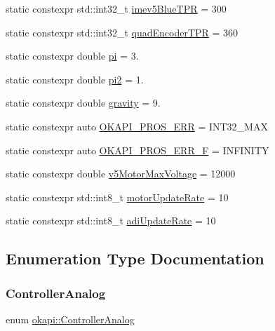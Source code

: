 \begin{DoxyCompactItemize}
\item 
static constexpr std\+::int32\+\_\+t \mbox{\hyperlink{namespaceokapi_a8d9e012d255d1fc2154c0dd9345d61ae}{imev5\+Blue\+T\+PR}} = 300
\item 
static constexpr std\+::int32\+\_\+t \mbox{\hyperlink{namespaceokapi_ad45ebef87cdaccd36ca4234d0bfdeee3}{quad\+Encoder\+T\+PR}} = 360
\item 
static constexpr double \mbox{\hyperlink{namespaceokapi_a3456eff6b02ec38b7771c227250f101c}{pi}} = 3.
\item 
static constexpr double \mbox{\hyperlink{namespaceokapi_a0f3c3909136daa4ae9532361a870a213}{pi2}} = 1.
\item 
static constexpr double \mbox{\hyperlink{namespaceokapi_a35009d9782cfcf5a519ff7d8fc39f86f}{gravity}} = 9.
\item 
static constexpr auto \mbox{\hyperlink{namespaceokapi_a18913fb1230fd1353366981f1f78335c}{O\+K\+A\+P\+I\+\_\+\+P\+R\+O\+S\+\_\+\+E\+RR}} = I\+N\+T32\+\_\+\+M\+AX
\item 
static constexpr auto \mbox{\hyperlink{namespaceokapi_a0f2b0da948b0276b354ca035af11380e}{O\+K\+A\+P\+I\+\_\+\+P\+R\+O\+S\+\_\+\+E\+R\+R\+\_\+F}} = I\+N\+F\+I\+N\+I\+TY
\item 
static constexpr double \mbox{\hyperlink{namespaceokapi_a4507bf58013826d1597fd5e548175612}{v5\+Motor\+Max\+Voltage}} = 12000
\item 
static constexpr std\+::int8\+\_\+t \mbox{\hyperlink{namespaceokapi_af6ac90c5f9ae02ffb17466bafcfbec4c}{motor\+Update\+Rate}} = 10
\item 
static constexpr std\+::int8\+\_\+t \mbox{\hyperlink{namespaceokapi_abf765c88ac34df87d378fb66ea5fd20c}{adi\+Update\+Rate}} = 10
\end{DoxyCompactItemize}


\subsection{Enumeration Type Documentation}
\mbox{\label{namespaceokapi_afcc83d6a64f075a4dba212ff612c31d0}} 
\subsubsection{\texorpdfstring{ControllerAnalog}{ControllerAnalog}}
{\footnotesize\ttfamily enum \mbox{\hyperlink{namespaceokapi_afcc83d6a64f075a4dba212ff612c31d0}{okapi\+::\+Controller\+Analog}}\hspace{0.3cm}{\ttfamily [strong]}}

